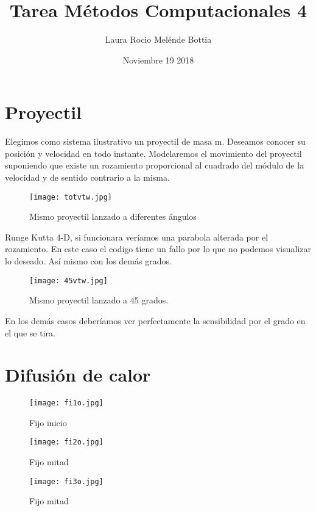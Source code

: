 \documentclass{article}
\title{Tarea Métodos Computacionales 4}
\author{Laura Rocio Melénde Bottia }
\date{Noviembre 19 2018}
\begin{document}
\maketitle

\section{Proyectil}
Elegimos como sistema ilustrativo un proyectil de masa m. Deseamos
conocer su posición y velocidad en todo instante.
Modelaremos el movimiento del proyectil suponiendo que existe un
rozamiento proporcional al cuadrado del módulo de la velocidad y de
sentido contrario a la misma.

\begin{figure}[h!]
\centering
\texttt{[image: totvtw.jpg]}
\caption{Mismo proyectil lanzado a diferentes ángulos }
\label{fig:universe}
\end{figure}

Runge Kutta 4-D, si funcionara veríamos una parabola alterada por el rozamiento. En este caso el codigo tiene un fallo por lo que no podemos visualizar lo deseado. Así mismo con los demás grados.


\begin{figure}[h!]
\centering
\texttt{[image: 45vtw.jpg]}
\caption{Mismo proyectil lanzado a 45 grados. }
\label{fig:universe}
\end{figure}

En los demás casos deberíamos ver perfectamente la sensibilidad por el grado en el que se tira. 


\section{Difusión de calor}

\begin{figure}[h!]
\centering
\texttt{[image: fi1o.jpg]}
\caption{Fijo inicio }
\label{fig:universe}
\end{figure}

\begin{figure}[h!]
\centering
\texttt{[image: fi2o.jpg]}
\caption{Fijo mitad }
\label{fig:universe}
\end{figure}

\begin{figure}[h!]
\centering
\texttt{[image: fi3o.jpg]}
\caption{Fijo mitad}
\label{fig:universe}
\end{figure}
\end{document}
